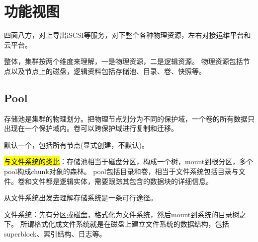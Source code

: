 \chapter{功能视图}


四面八方，对上导出iSCSI等服务，对下整个各种物理资源，左右对接运维平台和云平台。

整体，集群按两个维度来理解，一是物理资源，二是逻辑资源。
物理资源包括节点以及节点上的磁盘，逻辑资料包括存储池、目录、卷、快照等。

\section{Pool}

存储池是集群的物理划分。把物理节点划分为不同的保护域，一个卷的所有数据只出现在一个保护域内。卷可以跨保护域进行复制和迁移。

默认一个，包括所有节点(显式创建，不默认)。

\hl{与文件系统的类比}：存储池相当于磁盘分区，构成一个树，mount到根分区，多个pool构成chunk对象的森林。
pool包括目录和卷，相当于文件系统包括目录与文件。卷和文件都是逻辑实体，需要跟踪其包含的数据块的详细信息。

从文件系统出发去理解存储系统是一条可行途径。

文件系统：先有分区或磁盘，格式化为文件系统，然后mount到系统的目录树之下。
所谓格式化成文件系统就是在磁盘上建立文件系统的数据结构，包括superblock、索引结构、日志等。

